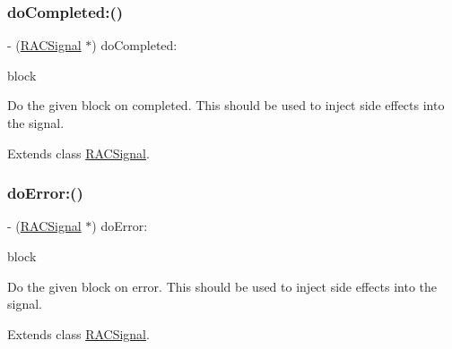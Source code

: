\subsubsection{\texorpdfstring{do\+Completed\+:()}{doCompleted:()}\hspace{0.1cm}{\footnotesize\ttfamily [3/3]}}
{\footnotesize\ttfamily -\/ (\mbox{\hyperlink{interface_r_a_c_signal}{R\+A\+C\+Signal}} $\ast$) do\+Completed\+: \begin{DoxyParamCaption}\item[{(void($^\wedge$)(void))}]{block }\end{DoxyParamCaption}}

Do the given block on {\ttfamily completed}. This should be used to inject side effects into the signal. 

Extends class \mbox{\hyperlink{interface_r_a_c_signal_af88fe4c330bad925ed164ad8f12bdcc8}{R\+A\+C\+Signal}}.

\mbox{\label{category_r_a_c_signal_07_operations_08_ac97a1fc7c03123a75746f2602b7444b4}} 
\subsubsection{\texorpdfstring{do\+Error\+:()}{doError:()}\hspace{0.1cm}{\footnotesize\ttfamily [1/3]}}
{\footnotesize\ttfamily -\/ (\mbox{\hyperlink{interface_r_a_c_signal}{R\+A\+C\+Signal}} $\ast$) do\+Error\+: \begin{DoxyParamCaption}\item[{(void($^\wedge$)(N\+S\+Error $\ast$error))}]{block }\end{DoxyParamCaption}}

Do the given block on {\ttfamily error}. This should be used to inject side effects into the signal. 

Extends class \mbox{\hyperlink{interface_r_a_c_signal_ac97a1fc7c03123a75746f2602b7444b4}{R\+A\+C\+Signal}}.

\mbox{\label{category_r_a_c_signal_07_operations_08_ac97a1fc7c03123a75746f2602b7444b4}} 
